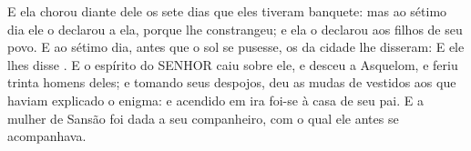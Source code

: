 {  E ela chorou diante dele os sete dias que eles tiveram banquete: mas ao sétimo dia ele o declarou a ela, porque lhe constrangeu; e ela o declarou aos filhos de seu povo.
  E ao sétimo dia, antes que o sol se pusesse, os da cidade lhe disseram:  E ele lhes disse .
  E o espírito do SENHOR caiu sobre ele, e desceu a Asquelom, e feriu trinta homens deles; e tomando seus despojos, deu as mudas de vestidos aos que haviam explicado o enigma: e acendido em ira foi-se à casa de seu pai.
  E a mulher de Sansão foi dada a seu companheiro, com o qual ele antes se acompanhava.
\par }

